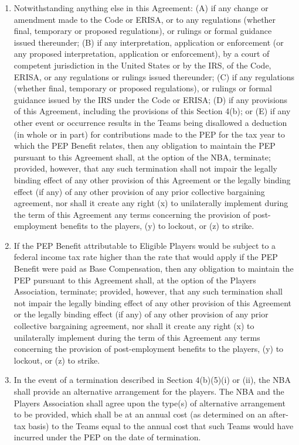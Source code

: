 \documentclass[
]{book}
\providecommand{\tightlist}{%
  \setlength{\itemsep}{0pt}\setlength{\parskip}{0pt}}
\begin{document}
\begin{enumerate}
\begin{enumerate}
    \begin{enumerate}
    \def\labelenumiii{(\roman{enumiii})}
    \tightlist
    \item
      Notwithstanding anything else in this Agreement: (A) if any change or amendment made to the Code or ERISA, or to any regulations (whether final, temporary or proposed regulations), or rulings or formal guidance issued thereunder; (B) if any interpretation, application or enforcement (or any proposed interpretation, application or enforcement), by a court of competent jurisdiction in the United States or by the IRS, of the Code, ERISA, or any regulations or rulings issued thereunder; (C) if any regulations (whether final, temporary or proposed regulations), or rulings or formal guidance issued by the IRS under the Code or ERISA; (D) if any provisions of this Agreement, including the provisions of this Section 4(b); or (E) if any other event or occurrence results in the Teams being disallowed a deduction (in whole or in part) for contributions made to the PEP for the tax year to which the PEP Benefit relates, then any obligation to maintain the PEP pursuant to this Agreement shall, at the option of the NBA, terminate; provided, however, that any such termination shall not impair the legally binding effect of any other provision of this Agreement or the legally binding effect (if any) of any other provision of any prior collective bargaining agreement, nor shall it create any right (x) to unilaterally implement during the term of this Agreement any terms concerning the provision of post-employment benefits to the players, (y) to lockout, or (z) to strike.
    \item
      If the PEP Benefit attributable to Eligible Players would be subject to a federal income tax rate higher than the rate that would apply if the PEP Benefit were paid as Base Compensation, then any obligation to maintain the PEP pursuant to this Agreement shall, at the option of the Players Association, terminate; provided, however, that any such termination shall not impair the legally binding effect of any other provision of this Agreement or the legally binding effect (if any) of any other provision of any prior collective bargaining agreement, nor shall it create any right (x) to unilaterally implement during the term of this Agreement any terms concerning the provision of post-employment benefits to the players, (y) to lockout, or (z) to strike.
    \item
      In the event of a termination described in Section 4(b)(5)(i) or (ii), the NBA shall provide an alternative arrangement for the players. The NBA and the Players Association shall agree upon the type(s) of alternative arrangement to be provided, which shall be at an annual cost (as determined on an after-tax basis) to the Teams equal to the annual cost that such Teams would have incurred under the PEP on the date of termination.

\end{enumerate}
\end{enumerate}
\end{enumerate}
\end{document}
